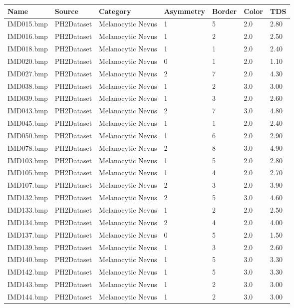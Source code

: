 \begin{longtable}{ | l | l | l | l | l | l | l |}
\hline
Name & Source & Category & Asymmetry & Border & Color & TDS \\ \hline
IMD015.bmp & PH2Dataset & Melanocytic Nevus & 1 & 5 & 2.0 & 2.80 \\
IMD016.bmp & PH2Dataset & Melanocytic Nevus & 1 & 2 & 2.0 & 2.50 \\
IMD018.bmp & PH2Dataset & Melanocytic Nevus & 1 & 1 & 2.0 & 2.40 \\
IMD020.bmp & PH2Dataset & Melanocytic Nevus & 0 & 1 & 2.0 & 1.10 \\
IMD027.bmp & PH2Dataset & Melanocytic Nevus & 2 & 7 & 2.0 & 4.30 \\
IMD038.bmp & PH2Dataset & Melanocytic Nevus & 1 & 2 & 3.0 & 3.00 \\
IMD039.bmp & PH2Dataset & Melanocytic Nevus & 1 & 3 & 2.0 & 2.60 \\
IMD043.bmp & PH2Dataset & Melanocytic Nevus & 2 & 7 & 3.0 & 4.80 \\
IMD045.bmp & PH2Dataset & Melanocytic Nevus & 1 & 1 & 2.0 & 2.40 \\
IMD050.bmp & PH2Dataset & Melanocytic Nevus & 1 & 6 & 2.0 & 2.90 \\
IMD078.bmp & PH2Dataset & Melanocytic Nevus & 2 & 8 & 3.0 & 4.90 \\
IMD103.bmp & PH2Dataset & Melanocytic Nevus & 1 & 5 & 2.0 & 2.80 \\
IMD105.bmp & PH2Dataset & Melanocytic Nevus & 1 & 4 & 2.0 & 2.70 \\
IMD107.bmp & PH2Dataset & Melanocytic Nevus & 2 & 3 & 2.0 & 3.90 \\
IMD132.bmp & PH2Dataset & Melanocytic Nevus & 2 & 5 & 3.0 & 4.60 \\
IMD133.bmp & PH2Dataset & Melanocytic Nevus & 1 & 2 & 2.0 & 2.50 \\
IMD134.bmp & PH2Dataset & Melanocytic Nevus & 2 & 4 & 2.0 & 4.00 \\
IMD137.bmp & PH2Dataset & Melanocytic Nevus & 0 & 5 & 2.0 & 1.50 \\
IMD139.bmp & PH2Dataset & Melanocytic Nevus & 1 & 3 & 2.0 & 2.60 \\
IMD140.bmp & PH2Dataset & Melanocytic Nevus & 1 & 5 & 3.0 & 3.30 \\
IMD142.bmp & PH2Dataset & Melanocytic Nevus & 1 & 5 & 3.0 & 3.30 \\
IMD143.bmp & PH2Dataset & Melanocytic Nevus & 1 & 2 & 3.0 & 3.00 \\
IMD144.bmp & PH2Dataset & Melanocytic Nevus & 1 & 2 & 3.0 & 3.00 \\

\end{longtable}
